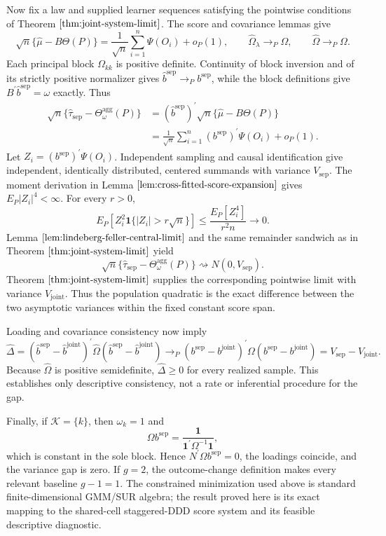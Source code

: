 Now fix a law and supplied learner sequences satisfying the pointwise conditions of Theorem \(\ref{thm:joint-system-limit}\). The score and covariance lemmas give
\[
\sqrt n\{\widehat\mu-B\Theta(P)\}
=\frac1{\sqrt n}\sum_{i=1}^n\Psi(O_i)+o_P(1),
\qquad
\widehat\Omega_\lambda\to_P\Omega,
\qquad
\widehat\Omega\to_P\Omega.
\]
Each principal block \(\Omega_{kk}\) is positive definite. Continuity of block inversion and of its strictly positive normalizer gives \(\widehat b^{\mathrm{sep}}\to_Pb^{\mathrm{sep}}\), while the block definitions give \(B^{\prime}\widehat b^{\mathrm{sep}}=\omega\) exactly. Thus
\[
\begin{aligned}
\sqrt n\{\widehat\tau_{\mathrm{sep}}-\Theta_\omega^{\mathrm{agg}}(P)\}
&=(\widehat b^{\mathrm{sep}})^{\prime}
  \sqrt n\{\widehat\mu-B\Theta(P)\}\\
&=\frac1{\sqrt n}\sum_{i=1}^n
  (b^{\mathrm{sep}})^{\prime}\Psi(O_i)+o_P(1).
\end{aligned}
\]
Let \(Z_i=(b^{\mathrm{sep}})^{\prime}\Psi(O_i)\). Independent sampling and causal identification give independent, identically distributed, centered summands with variance \(V_{\mathrm{sep}}\). The moment derivation in Lemma \(\ref{lem:cross-fitted-score-expansion}\) gives \(E_P|Z_i|^4<\infty\). For every \(r>0\),
\[
E_P[Z_i^2\mathbf 1\{|Z_i|>r\sqrt n\}]
\le\frac{E_P[Z_i^4]}{r^2n}\longrightarrow0.
\]
Lemma \(\ref{lem:lindeberg-feller-central-limit}\) and the same remainder sandwich as in Theorem \(\ref{thm:joint-system-limit}\) yield
\[
\sqrt n\{\widehat\tau_{\mathrm{sep}}-\Theta_\omega^{\mathrm{agg}}(P)\}
\rightsquigarrow N(0,V_{\mathrm{sep}}).
\]
Theorem \(\ref{thm:joint-system-limit}\) supplies the corresponding pointwise limit with variance \(V_{\mathrm{joint}}\). Thus the population quadratic is the exact difference between the two asymptotic variances within the fixed constant score span.

Loading and covariance consistency now imply
\[
\widehat\Delta
=(\widehat b^{\mathrm{sep}}-\widehat b^{\mathrm{joint}})^{\prime}
 \widehat\Omega
 (\widehat b^{\mathrm{sep}}-\widehat b^{\mathrm{joint}})
\to_P
(b^{\mathrm{sep}}-b^{\mathrm{joint}})^{\prime}
 \Omega(b^{\mathrm{sep}}-b^{\mathrm{joint}})
=V_{\mathrm{sep}}-V_{\mathrm{joint}}.
\]
Because \(\widehat\Omega\) is positive semidefinite, \(\widehat\Delta\ge0\) for every realized sample. This establishes only descriptive consistency, not a rate or inferential procedure for the gap.

Finally, if \(\mathcal K=\{k\}\), then \(\omega_k=1\) and
\[
\Omega b^{\mathrm{sep}}
=\frac{\mathbf 1}{\mathbf 1^{\prime}\Omega^{-1}\mathbf 1},
\]
which is constant in the sole block. Hence \(N^{\prime}\Omega b^{\mathrm{sep}}=0\), the loadings coincide, and the variance gap is zero. If \(g=2\), the outcome-change definition makes every relevant baseline \(g-1=1\). The constrained minimization used above is standard finite-dimensional GMM/SUR algebra; the result proved here is its exact mapping to the shared-cell staggered-DDD score system and its feasible descriptive diagnostic.